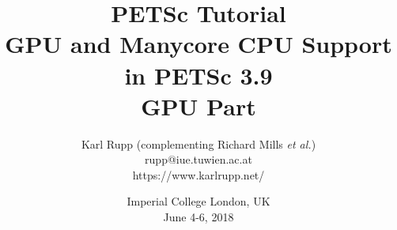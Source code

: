 \documentclass[usepdftitle=false,9pt]{beamer}
\author[Karl Rupp]{Karl Rupp (complementing Richard Mills \textit{et al.}) \\ \ttfamily rupp@iue.tuwien.ac.at \\ https://www.karlrupp.net/}
\institute[Freelance]
{ \footnotesize
  Institute for Microelectronics, TU Wien
}
\title[PETSc]{ { { \Huge PETSc Tutorial } \\ GPU and Manycore CPU Support in PETSc 3.9 \\[1em] GPU Part } %
             }
\date[PETSc 2018, June 4-6, 2018]{ \footnotesize Imperial College London, UK \\[1em] June 4-6, 2018}
\begin{document}
\begin{frame}[plain]
 \frametitle{~}
 \titlepage
\end{frame}


\end{document}
